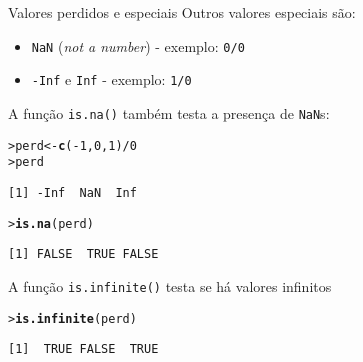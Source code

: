 \documentclass[10pt,handout]{beamer}\usepackage{graphicx, color}
\makeatletter
\newcommand{\hlfunctioncall}[1]{\textcolor[rgb]{0,0,0.545098039215686}{\textbf{#1}}}%
\newenvironment{kframe}{%
 \def\at@end@of@kframe{}%
 \ifinner\ifhmode%
  \def\at@end@of@kframe{\end{minipage}}%
  \begin{minipage}{\columnwidth}%
 \fi\fi%
 \def\FrameCommand##1{\hskip\@totalleftmargin \hskip-\fboxsep
 \colorbox{shadecolor}{##1}\hskip-\fboxsep
     \hskip-\linewidth \hskip-\@totalleftmargin \hskip\columnwidth}%
 \MakeFramed {\advance\hsize-\width
   \@totalleftmargin\z@ \linewidth\hsize
   \@setminipage}}%
 {\par\unskip\endMakeFramed%
 \at@end@of@kframe}
\newenvironment{knitrout}{}{} %
\makeatother
\begin{document}
\begin{frame}[fragile=singleslide]{Valores perdidos e especiais}
Outros valores especiais são:
\begin{itemize}
\item \texttt{NaN} (\textit{not a number}) - exemplo: \texttt{0/0}
\item \texttt{-Inf} e \texttt{Inf} - exemplo: \texttt{1/0}
\end{itemize}
A função \texttt{is.na()} também testa a presença de \texttt{NaN}s:
\begin{knitrout}\small
{}\color{fgcolor}\begin{kframe}
\begin{alltt}
> perd <- \hlfunctioncall{c}(-1,0,1)/0
> perd
\end{alltt}
\begin{verbatim}
[1] -Inf  NaN  Inf
\end{verbatim}
\begin{alltt}
> \hlfunctioncall{is.na}(perd)
\end{alltt}
\begin{verbatim}
[1] FALSE  TRUE FALSE
\end{verbatim}
\end{kframe}
\end{knitrout}

A função \verb|is.infinite()| testa se há valores infinitos
\begin{knitrout}\small
{}\color{fgcolor}\begin{kframe}
\begin{alltt}
> \hlfunctioncall{is.infinite}(perd)
\end{alltt}
\begin{verbatim}
[1]  TRUE FALSE  TRUE
\end{verbatim}
\end{kframe}
\end{knitrout}

\end{frame}
\end{document}

